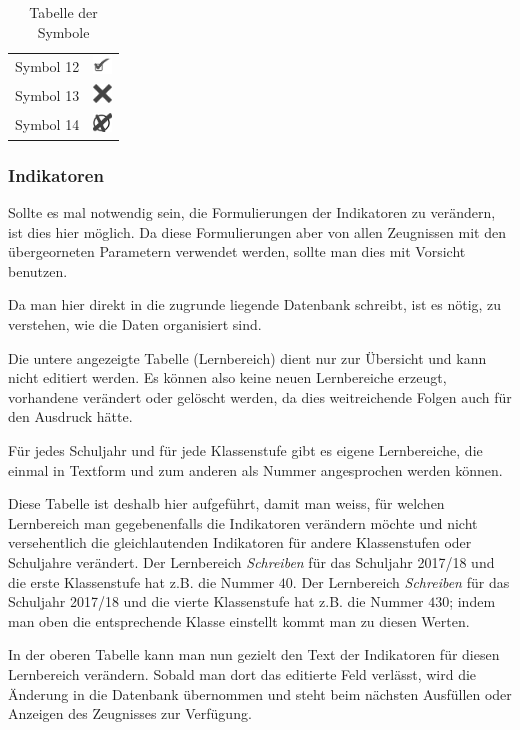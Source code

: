 \documentclass[a4paper,notitlepage,parskip]{scrartcl}
\begin{document}
\begin{table}[H]
\begin{center}
\begin{tabular}{|l|c|}
Symbol 12& \includegraphics[width=5mm]{img12.png} \\
Symbol 13& \includegraphics[width=5mm]{img13.png} \\
Symbol 14& \includegraphics[width=5mm]{img14.png} \\
\hline
\end{tabular}
\caption{Tabelle der Symbole}
\end{center}
\end{table}

\subsubsection{Indikatoren}
Sollte es mal notwendig sein, die Formulierungen der Indikatoren zu verändern, ist dies hier möglich.
Da diese Formulierungen aber von allen Zeugnissen mit den übergeorneten Parametern verwendet werden, sollte man dies mit Vorsicht benutzen.

Da man hier direkt in die zugrunde liegende Datenbank schreibt, ist es nötig, zu verstehen, wie die Daten organisiert sind.

Die untere angezeigte Tabelle (Lernbereich) dient nur zur Übersicht und kann nicht editiert werden.
Es können also keine neuen Lernbereiche erzeugt, vorhandene verändert oder gelöscht werden, da dies weitreichende Folgen auch für den Ausdruck hätte.

Für jedes Schuljahr und für jede Klassenstufe gibt es eigene Lernbereiche, die einmal in Textform und zum anderen als Nummer angesprochen werden können.

Diese Tabelle ist deshalb hier aufgeführt, damit man weiss, für welchen Lernbereich man gegebenenfalls die Indikatoren verändern möchte und nicht versehentlich die gleichlautenden Indikatoren für andere Klassenstufen oder Schuljahre verändert. Der Lernbereich \emph{Schreiben} für das Schuljahr 2017/18 und die erste Klassenstufe hat z.B. die Nummer $40$.
Der Lernbereich \emph{Schreiben} für das Schuljahr 2017/18 und die vierte Klassenstufe hat z.B. die Nummer $430$; indem man oben die entsprechende Klasse einstellt kommt man zu diesen Werten.

In der oberen Tabelle kann man nun gezielt den Text der Indikatoren für diesen Lernbereich verändern. Sobald man dort das editierte Feld verlässt, wird die Änderung in die Datenbank übernommen und steht beim nächsten Ausfüllen oder Anzeigen des Zeugnisses zur Verfügung.
\end{document}
